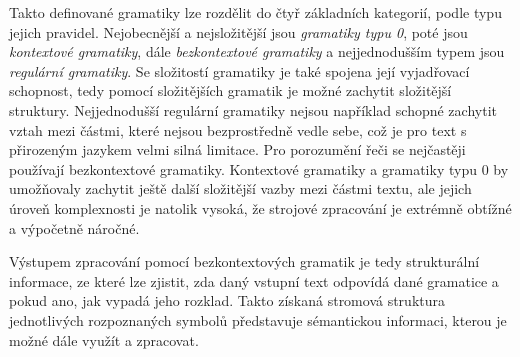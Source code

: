 Takto definované gramatiky lze rozdělit do čtyř základních kategorií, podle typu jejich pravidel.
Nejobecnější a nejsložitější jsou \emph{gramatiky typu 0}, poté jsou \emph{kontextové gramatiky},
dále \emph{bezkontextové gramatiky} a nejjednodušším typem jsou \emph{regulární gramatiky}.
Se složitostí gramatiky je také spojena její vyjadřovací schopnost, tedy pomocí složitějších gramatik je možné
zachytit složitější struktury.
Nejjednodušší regulární gramatiky nejsou například schopné zachytit vztah mezi částmi, které nejsou bezprostředně vedle
sebe, což je pro text s přirozeným jazykem velmi silná limitace.
Pro porozumění řeči se nejčastěji používají bezkontextové gramatiky.
Kontextové gramatiky a gramatiky typu 0 by umožňovaly zachytit ještě další složitější vazby mezi částmi
textu, ale jejich úroveň komplexnosti je natolik vysoká,
že strojové zpracování je extrémně obtížné a výpočetně náročné.~\cite{PsutkaJ_2006_Mluvimes}

Výstupem zpracování pomocí bezkontextových gramatik je tedy strukturální informace, ze které lze zjistit,
zda daný vstupní text odpovídá dané gramatice a pokud ano, jak vypadá jeho rozklad.
Takto získaná stromová struktura jednotlivých rozpoznaných symbolů představuje sémantickou informaci,
kterou je možné dále využít a zpracovat.
